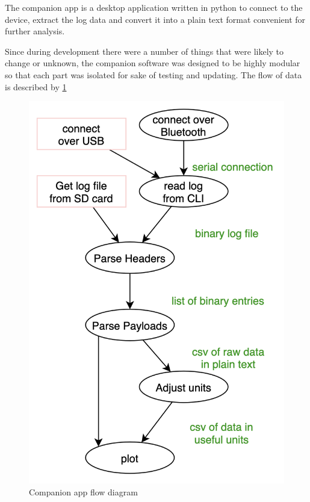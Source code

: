 The companion app is a desktop application written in python to connect to the device, extract the log data and convert it into a plain text format convenient for further analysis.

Since during development there were a number of things that were likely to change or unknown, the companion software was designed to be highly modular so that each part was isolated for sake of testing and updating.  The flow of data is described by \ref{fig:companion_app}

\begin{figure}[!htb]
    \centering
    \includegraphics[width=\textwidth+5cm,height=\textheight,keepaspectratio]{images/companion_app_flow.png}
    \caption{Companion app flow diagram}
    \label{fig:companion_app}
\end{figure}
    

